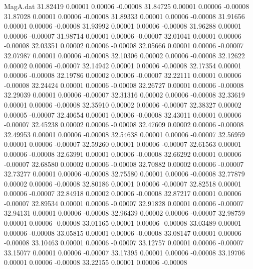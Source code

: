 \begin{filecontents}{MagA.dat}
  31.82419    0.00001    0.00006   -0.00008
  31.84725    0.00001    0.00006   -0.00008
  31.87028    0.00001    0.00006   -0.00008
  31.89333    0.00001    0.00006   -0.00008
  31.91656    0.00001    0.00006   -0.00008
  31.93992    0.00001    0.00006   -0.00008
  31.96288    0.00001    0.00006   -0.00007
  31.98714    0.00001    0.00006   -0.00007
  32.01041    0.00001    0.00006   -0.00008
  32.03351    0.00002    0.00006   -0.00008
  32.05666    0.00001    0.00006   -0.00007
  32.07987    0.00001    0.00006   -0.00008
  32.10306    0.00002    0.00006   -0.00008
  32.12622    0.00002    0.00006   -0.00007
  32.14942    0.00001    0.00006   -0.00008
  32.17354    0.00001    0.00006   -0.00008
  32.19786    0.00002    0.00006   -0.00007
  32.22111    0.00001    0.00006   -0.00008
  32.24424    0.00001    0.00006   -0.00008
  32.26727    0.00001    0.00006   -0.00008
  32.29039    0.00001    0.00006   -0.00007
  32.31316    0.00002    0.00006   -0.00008
  32.33619    0.00001    0.00006   -0.00008
  32.35910    0.00002    0.00006   -0.00007
  32.38327    0.00002    0.00005   -0.00007
  32.40654    0.00001    0.00006   -0.00008
  32.43011    0.00001    0.00006   -0.00007
  32.45238    0.00002    0.00006   -0.00008
  32.47609    0.00002    0.00006   -0.00008
  32.49953    0.00001    0.00006   -0.00008
  32.54638    0.00001    0.00006   -0.00007
  32.56959    0.00001    0.00006   -0.00007
  32.59260    0.00001    0.00006   -0.00007
  32.61563    0.00001    0.00006   -0.00008
  32.63991    0.00001    0.00006   -0.00008
  32.66292    0.00001    0.00006   -0.00007
  32.68580    0.00002    0.00006   -0.00008
  32.70882    0.00002    0.00006   -0.00007
  32.73277    0.00001    0.00006   -0.00008
  32.75580    0.00001    0.00006   -0.00008
  32.77879    0.00002    0.00006   -0.00008
  32.80186    0.00001    0.00006   -0.00007
  32.82518    0.00001    0.00006   -0.00007
  32.84918    0.00002    0.00006   -0.00008
  32.87217    0.00001    0.00006   -0.00007
  32.89534    0.00001    0.00006   -0.00007
  32.91828    0.00001    0.00006   -0.00007
  32.94131    0.00001    0.00006   -0.00008
  32.96439    0.00002    0.00006   -0.00007
  32.98759    0.00001    0.00006   -0.00008
  33.01165    0.00001    0.00006   -0.00008
  33.03489    0.00001    0.00006   -0.00008
  33.05815    0.00001    0.00006   -0.00008
  33.08147    0.00001    0.00006   -0.00008
  33.10463    0.00001    0.00006   -0.00007
  33.12757    0.00001    0.00006   -0.00007
  33.15077    0.00001    0.00006   -0.00007
  33.17395    0.00001    0.00006   -0.00008
  33.19706    0.00001    0.00006   -0.00008
  33.22155    0.00001    0.00006   -0.00008

\end{filecontents}
